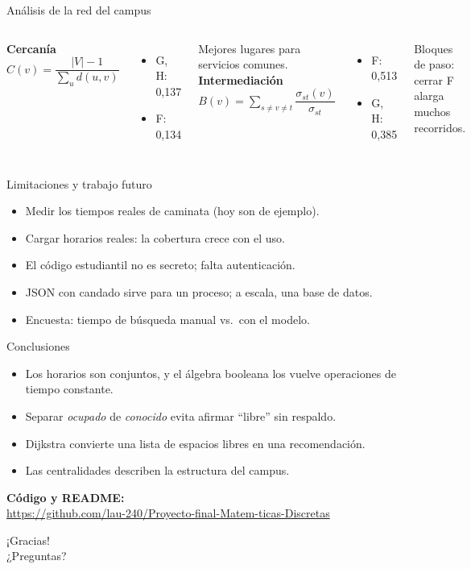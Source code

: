 \documentclass[aspectratio=169,11pt]{beamer}
\newcommand{\repo}{\url{https://github.com/lau-240/Proyecto-final-Matem-ticas-Discretas}}
\begin{document}
\begin{frame}{Análisis de la red del campus}
\begin{columns}[T]
\textbf{Cercanía} $C(v)=\dfrac{|V|-1}{\sum_u d(u,v)}$
\begin{itemize}
  \item G, H: 0,137
  \item F: 0,134
\end{itemize}
\small Mejores lugares para servicios comunes.
\textbf{Intermediación} $B(v)=\sum\limits_{s\neq v\neq t}\dfrac{\sigma_{st}(v)}{\sigma_{st}}$
\begin{itemize}
  \item F: 0,513
  \item G, H: 0,385
\end{itemize}
\small Bloques de paso: cerrar F alarga muchos recorridos.
\end{columns}
\end{frame}

\begin{frame}{Limitaciones y trabajo futuro}
\begin{itemize}
  \item Medir los tiempos reales de caminata (hoy son de ejemplo).
  \item Cargar horarios reales: la cobertura crece con el uso.
  \item El código estudiantil no es secreto; falta autenticación.
  \item JSON con candado sirve para un proceso; a escala, una base de datos.
  \item Encuesta: tiempo de búsqueda manual vs.\ con el modelo.
\end{itemize}
\end{frame}

\begin{frame}{Conclusiones}
\begin{itemize}
  \item Los horarios son conjuntos, y el álgebra booleana los vuelve operaciones de tiempo constante.
  \item Separar \emph{ocupado} de \emph{conocido} evita afirmar ``libre'' sin respaldo.
  \item Dijkstra convierte una lista de espacios libres en una recomendación.
  \item Las centralidades describen la estructura del campus.
\end{itemize}
\vfill
\begin{center}
\textbf{Código y README:}\\ \footnotesize\repo
\end{center}
\end{frame}

\begin{frame}[standout]
¡Gracias!\\[6pt]
\normalsize ¿Preguntas?
\end{frame}
\end{document}
